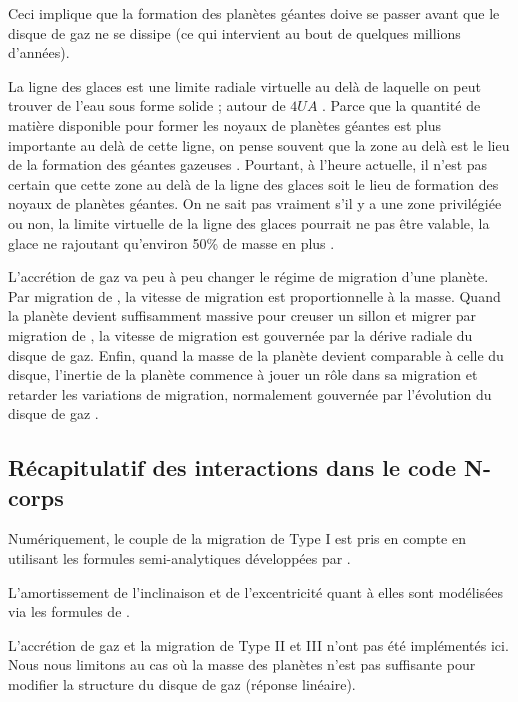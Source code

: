 Ceci implique que la formation des planètes géantes doive se passer avant que le disque de gaz ne se dissipe (ce qui intervient au bout de quelques millions d'années).

La ligne des glaces est une limite radiale virtuelle au delà de laquelle on peut trouver de l'eau sous forme solide ; autour de 
$4\unit{UA}$ \citep{martin2013evolution}. Parce que la quantité de matière disponible pour former les noyaux de planètes géantes 
est plus importante au delà de cette ligne, on pense souvent que la zone au delà est le lieu de la formation des géantes 
gazeuses \citep{sasselov2000snowline}. Pourtant, à l'heure actuelle, il n'est pas certain que cette zone au delà de la ligne 
des glaces soit le lieu de formation des noyaux de planètes géantes. On ne sait pas 
vraiment s'il y a une zone privilégiée ou non, la limite virtuelle de la ligne des glaces pourrait ne pas être valable, la glace 
ne rajoutant qu'environ 50\% de masse en plus \citep{lodders2003solar}.


\bigskip

L'accrétion de gaz va peu à peu changer le régime de migration d'une planète. Par migration de , la vitesse de migration est proportionnelle à la masse. Quand la planète devient suffisamment massive pour creuser un 
sillon et migrer par migration de , la vitesse de migration est gouvernée par la dérive 
radiale du disque de gaz. Enfin, quand la masse de la planète devient comparable à celle du disque, l'inertie de la planète 
commence à jouer un rôle dans sa migration et retarder les variations de migration, normalement gouvernée par l'évolution du 
disque de gaz \citep{crida2007cavity}.

\subsection{Récapitulatif des interactions dans le code N-corps}
Numériquement, le couple de la migration de Type I est pris en compte en utilisant les formules semi-analytiques développées par \cite{paardekooper2011torque}. 

L'amortissement de l'inclinaison et de l'excentricité quant à elles sont modélisées via les formules de 
\cite{cresswell2008three}.

L'accrétion de gaz et la migration de Type II et III n'ont pas été implémentés ici. Nous nous limitons au cas où la masse des 
planètes n'est pas suffisante pour modifier la structure du disque de gaz (réponse linéaire). 
